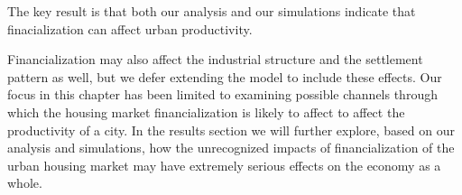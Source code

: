 The key result is that both our analysis and our simulations indicate that finacialization   can affect urban productivity. 

Financialization may also affect the industrial structure and the settlement pattern as well, but we defer extending the model to include these effects. Our focus in this chapter has been limited to examining possible channels through which the housing market financialization is likely to affect to affect the productivity of a city. In the results section we will further explore, based on our analysis and simulations, how the unrecognized impacts of financialization of the urban housing market may have extremely serious effects on the economy as a whole.









% 



